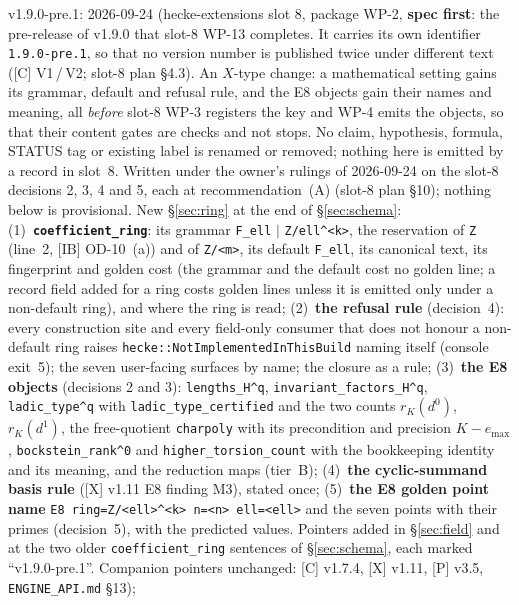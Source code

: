 \documentclass[11pt]{article}
\theoremstyle{remark}
\begin{document}
v1.9.0-pre.1: 2026-09-24 (hecke-extensions slot 8, package WP-2, \textbf{spec
first}: the pre-release of v1.9.0 that slot-8 WP-13 completes. It carries its own identifier
\texttt{1.9.0-pre.1}, so that no version number is published twice under different text ([C]
V1\,/\,V2; slot-8 plan \S4.3). An $X$-type change: a mathematical setting gains its grammar,
default and refusal rule, and the E8 objects gain their names and meaning, all \emph{before} slot-8
WP-3 registers the key and WP-4 emits the objects, so that their content gates are checks and not
stops. No claim, hypothesis, formula, STATUS tag or existing label is renamed or removed; nothing
here is emitted by a record in slot~8. Written under the owner's rulings of 2026-09-24 on the
slot-8 decisions 2, 3, 4 and 5, each at recommendation~(A) (slot-8 plan \S10); nothing below is
provisional. New \S\ref{sec:ring} at the end of \S\ref{sec:schema}:
(1)~\textbf{\texttt{coefficient\_ring}}: its grammar \texttt{F\_ell} $\mid$
\texttt{Z/ell\textasciicircum<k>}, the reservation of \texttt{Z} (line~2, [IB] OD-10~(a)) and of
\texttt{Z/<m>}, its default \texttt{F\_ell}, its canonical text, its fingerprint and golden cost
(the grammar and the default cost no golden line; a record field added for a ring costs golden
lines unless it is emitted only under a non-default ring), and where the ring is read;
(2)~\textbf{the refusal rule} (decision~4): every construction site and every field-only consumer
that does not honour a non-default ring raises \texttt{hecke::NotImplementedInThisBuild} naming
itself (console exit~5); the seven user-facing surfaces by name; the closure as a rule;
(3)~\textbf{the E8 objects} (decisions 2 and 3): \texttt{lengths\_H\textasciicircum q},
\texttt{invariant\_factors\_H\textasciicircum q}, \texttt{ladic\_type\textasciicircum q} with
\texttt{ladic\_type\_certified} and the two counts $r_K(d^0)$, $r_K(d^1)$, the free-quotient
\texttt{charpoly} with its precondition and precision $K-e_{\max}$, \texttt{bockstein\_rank\textasciicircum 0}
and \texttt{higher\_torsion\_count} with the bookkeeping identity and its meaning, and the
reduction maps (tier~B);
(4)~\textbf{the cyclic-summand basis rule} ([X] v1.11 E8 finding M3), stated once;
(5)~\textbf{the E8 golden point name} \texttt{E8 ring=Z/<ell>\textasciicircum<k> n=<n> ell=<ell>}
and the seven points with their primes (decision~5), with the predicted values.
Pointers added in \S\ref{sec:field} and at the two older \texttt{coefficient\_ring} sentences of
\S\ref{sec:schema}, each marked ``v1.9.0-pre.1''. Companion pointers unchanged: [C] v1.7.4,
[X] v1.11, [P] v3.5, \texttt{ENGINE\_API.md} \S13);
\end{document}
